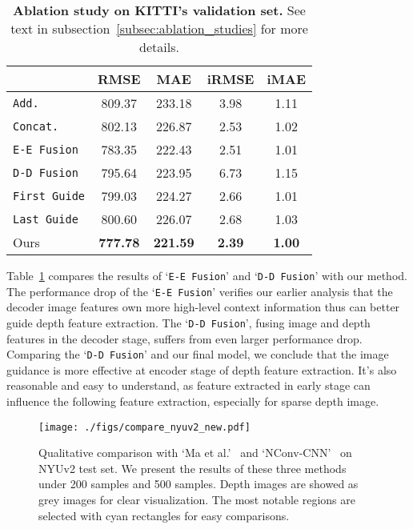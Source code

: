 \documentclass[journal]{IEEEtran}
\begin{document}
\begin{table}
   \caption{{\bf Ablation study on KITTI's validation set.} See text in subsection~\ref{subsec:ablation_studies} for more details.} \label{tab:ablation} 
   \begin{center}
   \small
   \begin{tabular}{l|c|c|c|c} \hline
    & \textbf{RMSE}   & MAE   & iRMSE & iMAE \\ \hline
   \texttt{Add.} & 809.37 & 233.18 & 3.98 & 1.11 \\
   \texttt{Concat.} & 802.13 & 226.87 & 2.53 & 1.02 \\
   \texttt{E-E Fusion} & 783.35 & 222.43 & 2.51 & 1.01 \\
   \texttt{D-D Fusion} & 795.64 & 223.95 & 6.73 & 1.15 \\
   \texttt{First Guide} & 799.03 & 224.27 & 2.66 & 1.01 \\
   \texttt{Last Guide} & 800.60 & 226.07 & 2.68 & 1.03 \\  \hline
   Ours & \textbf{777.78} & \textbf{221.59} & \textbf{2.39} & \textbf{1.00} \\ \hline
   \end{tabular}
   \end{center}
   
\end{table}

Table~\ref{tab:ablation} compares the results of `\texttt{E-E Fusion}' and `\texttt{D-D Fusion}' with our method.
The performance drop of the `\texttt{E-E Fusion}' verifies our earlier analysis that the decoder image features own more high-level context information thus can better guide depth feature extraction. 
The `\texttt{D-D Fusion}', fusing image and depth features in the decoder stage, suffers from even larger performance drop.
Comparing the `\texttt{D-D Fusion}' and our final model, we conclude that the image guidance is more effective at encoder stage of depth feature extraction.
It's also reasonable and easy to understand, as feature extracted in early stage can influence the following feature extraction, especially for sparse depth image.



\begin{figure*}
   \begin{center}
   \texttt{[image: ./figs/compare\_nyuv2\_new.pdf]}
   \end{center}
      \caption{Qualitative comparison with `Ma et al.'~\cite{sparse_to_dense} and `NConv-CNN'~\cite{cnn_confidence} on NYUv2 test set.
      We present the results of these three methods under 200 samples and 500 samples.
      Depth images are showed as grey images for clear visualization.
      The most notable regions are selected with cyan rectangles for easy comparisons.
      }
   \label{fig:compare_nyu_v2}
\end{figure*}
\end{document}
